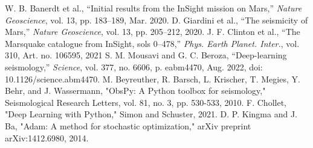 \documentclass[conference]{IEEEtran}
\begin{document}
\begin{thebibliography}{00}
     W. B. Banerdt et al., ``Initial results from the InSight mission on Mars,'' \emph{Nature Geoscience}, vol. 13, pp. 183--189, Mar. 2020.
     D. Giardini et al., ``The seismicity of Mars,'' \emph{Nature Geoscience}, vol. 13, pp. 205--212, 2020.
     J. F. Clinton et al., ``The Marsquake catalogue from InSight, sols 0--478,'' \emph{Phys. Earth Planet. Inter.}, vol. 310, Art. no. 106595, 2021
     S. M. Mousavi and G. C. Beroza, ``Deep-learning seismology,'' \emph{Science}, vol. 377, no. 6606, p. eabm4470, Aug. 2022, doi: 10.1126/science.abm4470.   
     M. Beyreuther, R. Barsch, L. Krischer, T. Megies, Y. Behr, and J. Wassermann, "ObsPy: A Python toolbox for seismology," Seismological Research Letters, vol. 81, no. 3, pp. 530-533, 2010.
     F. Chollet, "Deep Learning with Python," Simon and Schuster, 2021.
     D. P. Kingma and J. Ba, "Adam: A method for stochastic optimization," arXiv preprint arXiv:1412.6980, 2014.

\end{thebibliography}
\end{document}

